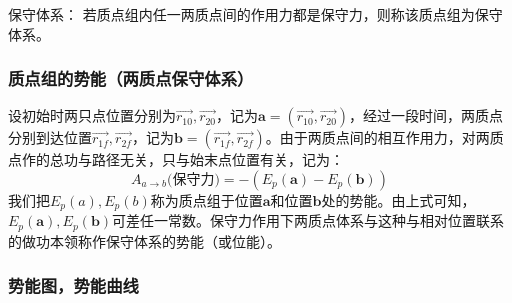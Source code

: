 保守体系：
若质点组内任一两质点间的作用力都是保守力，则称该质点组为保守体系。
\subsubsection{质点组的势能（两质点保守体系）}
设初始时两只点位置分别为$\vec{r_{10}},\vec{r_{20}}$，记为$\mathbf{a}=(\vec{r_{10}},\vec{r_{20}})$，经过一段时间，两质点分别到达位置$\vec{r_{1f}},\vec{r_{2f}}$，记为$\mathbf{b}=(\vec{r_{1f}},\vec{r_{2f}})$。由于两质点间的相互作用力，对两质点作的总功与路径无关，只与始末点位置有关，记为：\[A_{a\to b}\text{(保守力)} = -(E_p(\mathbf {a})-E_p(\mathbf {b}))\]
我们把$E_p(a),E_p(b)$称为质点组于位置$\mathbf{a}$和位置$\mathbf{b}$处的势能。由上式可知，$E_p(\mathbf{a}),E_p(\mathbf {b})$可差任一常数。保守力作用下两质点体系与这种与相对位置联系的做功本领称作保守体系的势能（或位能）。
\subsubsection{势能图，势能曲线}
